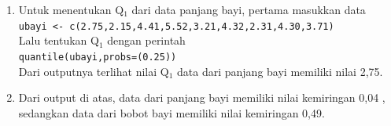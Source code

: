 \documentclass[a4paper,12pt]{article}
\begin{document}
\begin{enumerate}[label=\alph*.]
	\item 
	\begin{minipage}[t]{\linewidth}
		\raggedright
	\end{minipage}
	Untuk menentukan Q$_{1}$ dari data panjang bayi, pertama masukkan data\\
	\texttt{ubayi <- c(2.75,2.15,4.41,5.52,3.21,4.32,2.31,4.30,3.71)\\}
	Lalu tentukan Q$_{1}$ dengan perintah\\
	\texttt{quantile(ubayi,probs=(0.25))\\}
	Dari outputnya terlihat nilai Q$_{1}$ data dari panjang bayi memiliki nilai 2,75.
	
	\item 
	\begin{minipage}[t]{\linewidth}
		\raggedright
	\end{minipage}
	Dari output di atas, data dari panjang bayi memiliki nilai kemiringan 0,04 , sedangkan data dari bobot bayi memiliki nilai kemiringan 0,49.  
			
\end{enumerate}
\end{document}
